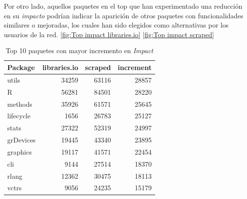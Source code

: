 Por otro lado, aquellos paquetes en el top que han experimentado una reducción en su \textit{impacto}
podrían indicar la aparición de otros paquetes con funcionalidades similares o mejoradas, los cuales han
sido elegidos como alternativas por los usuarios de la red. \ref{fig:Top impact libraries.io} \ref{fig:Top impact scraped}

\begin{table}[h!]
    \begin{center}
        \begin{tabular}{|l|r|r|r|}
            \hline
            \textbf{Package} & \textbf{libraries.io} & \textbf{scraped} & \textbf{increment} \\
            \hline
            utils            & 34259                 & 63116            & 28857              \\
            R                & 56281                 & 84501            & 28220              \\
            methods          & 35926                 & 61571            & 25645              \\
            lifecycle        & 1656                  & 26783            & 25127              \\
            stats            & 27322                 & 52319            & 24997              \\
            grDevices        & 19445                 & 43340            & 23895              \\
            graphics         & 19117                 & 41571            & 22454              \\
            cli              & 9144                  & 27514            & 18370              \\
            rlang            & 12362                 & 30475            & 18113              \\
            vctrs            & 9056                  & 24235            & 15179              \\
            \hline
        \end{tabular}
        \caption{Top 10 paquetes con mayor incremento en \textit{Impact}}
        \label{tab:Top 10 paquetes con mayor incremento en Impact}
    \end{center}
\end{table}

